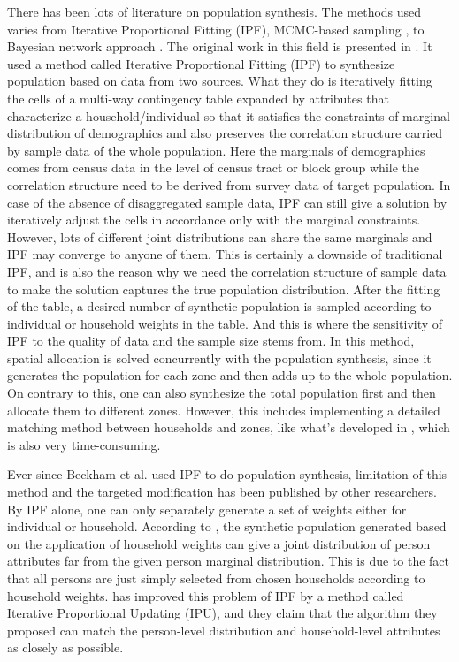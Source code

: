 \documentclass[11pt,twoside]{article}
\numberwithin{equation}{section}
\newcommand{\?}{\stackrel{?}{=}}
\begin{document}
There has been lots of literature on population synthesis.
The methods used varies from Iterative Proportional Fitting (IPF), MCMC-based sampling \cite{farooq2013simulation}, to Bayesian network approach \cite{sun2015bayesian}. The original work in this field is presented in \cite{beckman1996creating}. It used a method called Iterative Proportional Fitting (IPF) to synthesize population based on data from two sources. What they do is iteratively fitting the cells of a multi-way contingency table expanded by attributes that characterize a household/individual so that it satisfies the constraints of marginal distribution of demographics and also preserves the correlation structure carried by sample data of the whole population. Here the marginals of demographics comes from census data in the level of census tract or block group while the correlation structure need to be derived from survey data of target population. In case of the absence of disaggregated sample data, IPF can still give a solution by iteratively adjust the cells in accordance only with the marginal constraints. However, lots of different joint distributions can share the same marginals and IPF may converge to anyone of them. This is certainly a downside of traditional IPF, and is also the reason why we need the correlation structure of sample data to make the solution captures the true population distribution. After the fitting of the table, a desired number of synthetic population is sampled according to individual or household weights in the table. And this is where the sensitivity of IPF to the quality of data and the sample size stems from. In this method, spatial allocation is solved concurrently with the population synthesis, since it generates the population for each zone and then adds up to the whole population. On contrary to this, one can also synthesize the total population first and then allocate them to different zones. However, this includes implementing a detailed matching method between households and zones, like what's developed in \cite{ge2014virtual}, which is also very time-consuming. 

Ever since Beckham et al. used IPF to do population synthesis, limitation of this method and the targeted modification has been published by other researchers. By IPF alone, one can only separately generate a set of weights either for individual or household. According to \cite{ye2009methodology}, the synthetic population generated based on the application of household weights can give a joint distribution of person attributes far from the given person marginal distribution.
This is due to the fact that all persons are just simply selected from chosen households according to household weights.
\textcite{ye2009methodology} has improved this problem of IPF by a method called Iterative Proportional Updating (IPU), and they claim that the algorithm they proposed can match the person-level distribution and household-level attributes as closely as possible. \\
\end{document}
